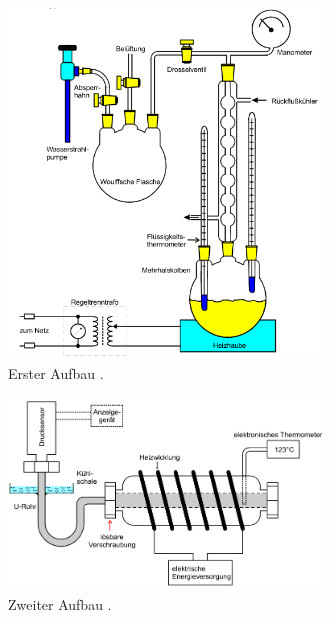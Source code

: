 \begin{figure}
    \centering
    \includegraphics[width=0.75\textwidth]{daten/aufbau1.png}
    \caption{Erster Aufbau \cite{anleitung}.}
    \label{fig:aufbau1}
\end{figure}

\begin{figure}
    \centering
    \includegraphics[width=0.75\textwidth]{daten/aufbau2.png}
    \caption{Zweiter Aufbau \cite{anleitung}.}
    \label{fig:aufbau2}
\end{figure}